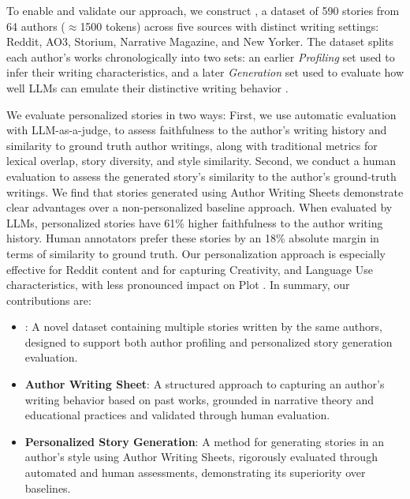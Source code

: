To enable and validate our approach, we construct \dataname, a dataset of 590 stories from 64 authors ($\approx$1500 tokens) across five sources with distinct writing settings: Reddit, AO3, Storium, Narrative Magazine, and New Yorker. The dataset splits each author's works chronologically into two sets: an earlier \emph{Profiling} set used to infer their writing characteristics, and a later \emph{Generation} set used to evaluate how well LLMs can emulate their distinctive writing behavior \citep{salemi-etal-2024-lamp}.

We evaluate personalized stories in two ways: First, we use automatic evaluation with LLM-as-a-judge, to assess faithfulness to the author's writing history and similarity to ground truth author writings, along with traditional metrics for lexical overlap, story diversity, and style similarity. Second, we conduct a human evaluation to assess the generated story's similarity to the author's ground-truth writings. 
We find that stories generated using Author Writing Sheets demonstrate clear advantages over a non-personalized baseline approach. When evaluated by LLMs, personalized stories have 61\% higher faithfulness to the author writing history. Human annotators prefer these stories by an 18\% absolute margin in terms of similarity to ground truth. Our personalization approach is especially effective for Reddit content and for capturing Creativity, and Language Use characteristics, with less pronounced impact on Plot \citep{tian-etal-2024-large-language, xu2024echoes}. In summary, our contributions are:
\begin{itemize}[noitemsep, topsep=0pt]
    \item \textbf{\dataname}: A novel dataset containing multiple stories written by the same authors, designed to support both author profiling and personalized story generation evaluation. 
    \item \textbf{Author Writing Sheet}: A structured approach to capturing an author’s writing behavior based on past works, grounded in narrative theory and educational practices and validated through human evaluation.
    \item \textbf{Personalized Story Generation}: A method for generating stories in an author's style using Author Writing Sheets, rigorously evaluated through automated and human assessments, demonstrating its superiority over baselines.
\end{itemize}

